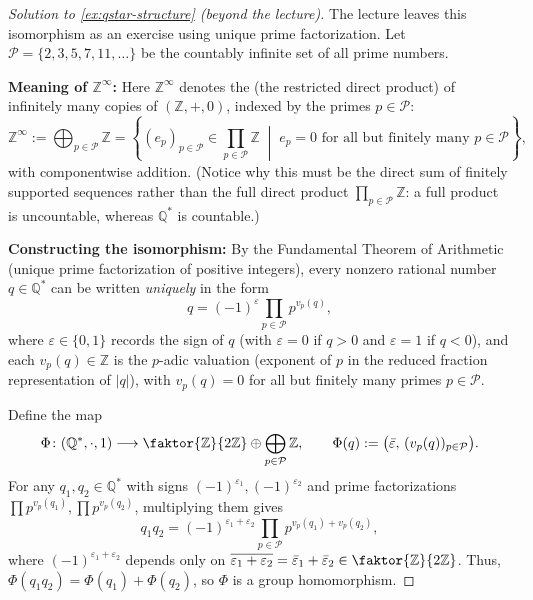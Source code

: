 \begin{content}

\begin{proof}[Solution to \cref{ex:qstar-structure} (beyond the lecture)]
The lecture leaves this isomorphism as an exercise using unique prime factorization. Let $\mathcal{P} = \{2, 3, 5, 7, 11, \dots\}$ be the countably infinite set of all prime numbers.

\textbf{Meaning of $\mathbb{Z}^\infty$:} Here $\mathbb{Z}^\infty$ denotes the  (the restricted direct product) of infinitely many copies of $(\mathbb{Z}, +, 0)$, indexed by the primes $p \in \mathcal{P}$:
\[
\mathbb{Z}^\infty := \bigoplus_{p \in \mathcal{P}} \mathbb{Z} = \left\{ (e_p)_{p \in \mathcal{P}} \in \prod_{p \in \mathcal{P}} \mathbb{Z} \;\middle|\; e_p = 0 \text{ for all but finitely many } p \in \mathcal{P} \right\},
\]
with componentwise addition. (Notice why this must be the direct sum of finitely supported sequences rather than the full direct product $\prod_{p \in \mathcal{P}} \mathbb{Z}$: a full product is uncountable, whereas $\mathbb{Q}^*$ is countable.)

\textbf{Constructing the isomorphism:} By the Fundamental Theorem of Arithmetic (unique prime factorization of positive integers), every nonzero rational number $q \in \mathbb{Q}^*$ can be written \emph{uniquely} in the form
\[
q = (-1)^{\varepsilon} \prod_{p \in \mathcal{P}} p^{v_p(q)},
\]
where $\varepsilon \in \{0, 1\}$ records the sign of $q$ (with $\varepsilon = 0$ if $q > 0$ and $\varepsilon = 1$ if $q < 0$), and each $v_p(q) \in \mathbb{Z}$ is the $p$-adic valuation (exponent of $p$ in the reduced fraction representation of $|q|$), with $v_p(q) = 0$ for all but finitely many primes $p \in \mathcal{P}$.

Define the map
\[
\Phi \colon (\mathbb{Q}^*, \cdot, 1) \longrightarrow \faktor{\mathbb{Z}}{2\mathbb{Z}} \oplus \bigoplus_{p \in \mathcal{P}} \mathbb{Z}, \qquad \Phi(q) := \bigl(\bar{\varepsilon},\, (v_p(q))_{p \in \mathcal{P}}\bigr).
\]
For any $q_1, q_2 \in \mathbb{Q}^*$ with signs $(-1)^{\varepsilon_1}, (-1)^{\varepsilon_2}$ and prime factorizations $\prod p^{v_p(q_1)}, \prod p^{v_p(q_2)}$, multiplying them gives
\[
q_1 q_2 = (-1)^{\varepsilon_1 + \varepsilon_2} \prod_{p \in \mathcal{P}} p^{v_p(q_1) + v_p(q_2)},
\]
where $(-1)^{\varepsilon_1 + \varepsilon_2}$ depends only on $\overline{\varepsilon_1 + \varepsilon_2} = \bar{\varepsilon}_1 + \bar{\varepsilon}_2 \in \faktor{\mathbb{Z}}{2\mathbb{Z}}$. Thus, $\Phi(q_1 q_2) = \Phi(q_1) + \Phi(q_2)$, so $\Phi$ is a group homomorphism.


\end{proof}
\end{content}
